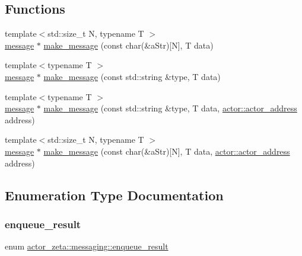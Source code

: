 \subsection*{Functions}
\begin{DoxyCompactItemize}
\item 
{\footnotesize template$<$std\+::size\+\_\+t N, typename T $>$ }\\\hyperlink{classactor__zeta_1_1messaging_1_1message}{message} $\ast$ \hyperlink{namespaceactor__zeta_1_1messaging_a9e63d189e59df07f1d3523c4916f9b47}{make\+\_\+message} (const char(\&a\+Str)\mbox{[}N\mbox{]}, T data)
\item 
{\footnotesize template$<$typename T $>$ }\\\hyperlink{classactor__zeta_1_1messaging_1_1message}{message} $\ast$ \hyperlink{namespaceactor__zeta_1_1messaging_a21ea28d14db328e347552fa3943410bf}{make\+\_\+message} (const std\+::string \&type, T data)
\item 
{\footnotesize template$<$typename T $>$ }\\\hyperlink{classactor__zeta_1_1messaging_1_1message}{message} $\ast$ \hyperlink{namespaceactor__zeta_1_1messaging_a81fe08e3ae76ca8eec5eb6f59f3912ba}{make\+\_\+message} (const std\+::string \&type, T data, \hyperlink{classactor__zeta_1_1actor_1_1actor__address}{actor\+::actor\+\_\+address} address)
\item 
{\footnotesize template$<$std\+::size\+\_\+t N, typename T $>$ }\\\hyperlink{classactor__zeta_1_1messaging_1_1message}{message} $\ast$ \hyperlink{namespaceactor__zeta_1_1messaging_acbb0a86110c3f12f5250dfc8f3df4861}{make\+\_\+message} (const char(\&a\+Str)\mbox{[}N\mbox{]}, T data, \hyperlink{classactor__zeta_1_1actor_1_1actor__address}{actor\+::actor\+\_\+address} address)
\end{DoxyCompactItemize}


\subsection{Enumeration Type Documentation}
\mbox{\label{namespaceactor__zeta_1_1messaging_ac2c5f2f473c5a97d779ec63a78d498a1}} 
\subsubsection{\texorpdfstring{enqueue\+\_\+result}{enqueue\_result}}
{\footnotesize\ttfamily enum \hyperlink{namespaceactor__zeta_1_1messaging_ac2c5f2f473c5a97d779ec63a78d498a1}{actor\+\_\+zeta\+::messaging\+::enqueue\+\_\+result}\hspace{0.3cm}{\ttfamily [strong]}}



